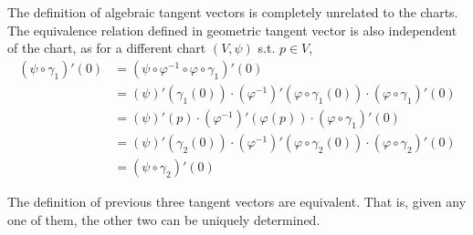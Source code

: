 \documentclass{article}
\begin{document}
\begin{remark}\label{rmk: geometric tangent vector independent of chart}
    The definition of algebraic tangent vectors is completely unrelated to the charts. The equivalence relation defined in geometric tangent vector is also independent of the chart, as for a different chart $(V, \psi)$ s.t. $p \in V$,
    \begin{align*}
        (\psi \circ \gamma_1)'(0) 
        & = (\psi \circ \varphi^{-1} \circ \varphi \circ \gamma_1)'(0) \\
        & = (\psi)'(\gamma_1(0)) \cdot (\varphi^{-1})'(\varphi \circ \gamma_1(0)) \cdot (\varphi \circ \gamma_1)'(0) \\
        & = (\psi)'(p) \cdot (\varphi^{-1})'(\varphi(p)) \cdot (\varphi \circ \gamma_1)'(0) \\
        & = (\psi)'(\gamma_2(0)) \cdot (\varphi^{-1})'(\varphi \circ \gamma_2(0)) \cdot (\varphi \circ \gamma_2)'(0) \\
        & = (\psi \circ \gamma_2)'(0)
    \end{align*}
\end{remark}

\begin{theorem}
    The definition of previous three tangent vectors are equivalent. That is, given any one of them, the other two can be uniquely determined.
\end{theorem}
\end{document}
